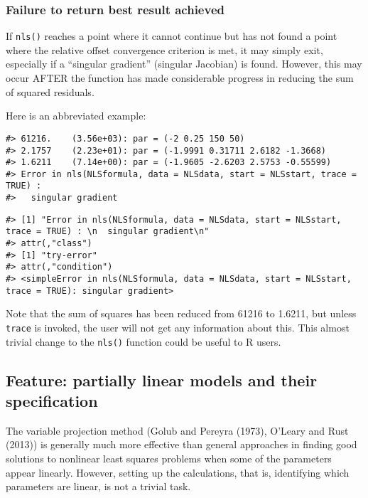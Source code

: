 \hypertarget{failure-to-return-best-result-achieved}{%
\subsubsection{Failure to return best result achieved}\label{failure-to-return-best-result-achieved}}

If \texttt{nls()} reaches a point where it cannot continue but has not found a point
where the relative offset convergence criterion is met, it may simply exit,
especially if a ``singular gradient'' (singular Jacobian) is found. However, this
may occur AFTER the function has made considerable progress in reducing the sum
of squared residuals.

Here is an abbreviated example:

\begin{verbatim}
#> 61216.    (3.56e+03): par = (-2 0.25 150 50)
#> 2.1757    (2.23e+01): par = (-1.9991 0.31711 2.6182 -1.3668)
#> 1.6211    (7.14e+00): par = (-1.9605 -2.6203 2.5753 -0.55599)
#> Error in nls(NLSformula, data = NLSdata, start = NLSstart, trace = TRUE) : 
#>   singular gradient
\end{verbatim}

\begin{verbatim}
#> [1] "Error in nls(NLSformula, data = NLSdata, start = NLSstart, trace = TRUE) : \n  singular gradient\n"
#> attr(,"class")
#> [1] "try-error"
#> attr(,"condition")
#> <simpleError in nls(NLSformula, data = NLSdata, start = NLSstart, trace = TRUE): singular gradient>
\end{verbatim}

Note that the sum of squares has been reduced from 61216 to 1.6211, but
unless \texttt{trace} is invoked, the user will not get any information about this.
This almost trivial change to the \texttt{nls()} function could be
useful to R users.

\hypertarget{feature-partially-linear-models-and-their-specification}{%
\subsection{Feature: partially linear models and their specification}\label{feature-partially-linear-models-and-their-specification}}

The variable projection method (Golub and Pereyra (1973), O'Leary and Rust (2013)) is generally much more
effective than general approaches in finding good solutions to nonlinear least
squares problems when some of the parameters appear linearly. However, setting
up the calculations, that is, identifying which parameters are linear, is not a
trivial task.

